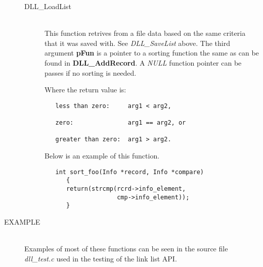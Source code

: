 \documentclass[10pt,letterpaper,titlepage]{article}
\begin{document}
\begin{description}
\begin{description}
 \item[DLL\_LoadList]\quad\\
 This function retrives from a file data based on the same criteria that it was saved with.  See \emph{DLL\_SaveList} above.  The third argument \textbf{pFun} is a pointer to a sorting function the same as can be found in \textbf{DLL\_AddRecord}.  A \emph{NULL} function pointer can be passes if no sorting is needed.
 \vspace{8pt}

 Where the return value is:
 \begin{verbatim}
   less than zero:     arg1 < arg2,

   zero:               arg1 == arg2, or

   greater than zero:  arg1 > arg2.
 \end{verbatim}

 Below is an example of this function.

 \begin{verbatim}
   int sort_foo(Info *record, Info *compare)
      {
      return(strcmp(rcrd->info_element,
                    cmp->info_element));
      }
 \end{verbatim}

 
 \end{description}

\item[EXAMPLE]\quad\\
Examples of most of these functions can be seen in the source file \emph{dll\_test.c} used in the testing of the link list API.
\end{description}
\end{document}
